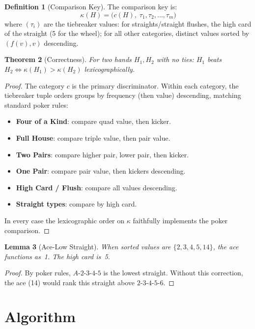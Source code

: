 \documentclass[12pt]{article}
\newtheorem{theorem}{Theorem}
\newtheorem{lemma}[theorem]{Lemma}
\theoremstyle{definition}
\newtheorem{definition}[theorem]{Definition}
\begin{document}
\begin{definition}[Comparison Key]
The comparison key is:
\[
\kappa(H) = \bigl(c(H),\; \tau_1, \tau_2, \ldots, \tau_m\bigr)
\]
where $(\tau_i)$ are the tiebreaker values: for straights/straight flushes, the high card of the straight (5 for the wheel); for all other categories, distinct values sorted by $(f(v), v)$ descending.
\end{definition}

\begin{theorem}[Correctness]
\label{thm:correct}
For two hands $H_1, H_2$ with no ties: $H_1$ beats $H_2 \iff \kappa(H_1) > \kappa(H_2)$ lexicographically.
\end{theorem}

\begin{proof}
The category $c$ is the primary discriminator. Within each category, the tiebreaker tuple orders groups by frequency (then value) descending, matching standard poker rules:
\begin{itemize}
    \item \textbf{Four of a Kind}: compare quad value, then kicker.
    \item \textbf{Full House}: compare triple value, then pair value.
    \item \textbf{Two Pairs}: compare higher pair, lower pair, then kicker.
    \item \textbf{One Pair}: compare pair value, then kickers descending.
    \item \textbf{High Card / Flush}: compare all values descending.
    \item \textbf{Straight types}: compare by high card.
\end{itemize}
In every case the lexicographic order on $\kappa$ faithfully implements the poker comparison.
\end{proof}

\begin{lemma}[Ace-Low Straight]
When sorted values are $\{2,3,4,5,14\}$, the ace functions as~1. The high card is~5.
\end{lemma}

\begin{proof}
By poker rules, $A$-$2$-$3$-$4$-$5$ is the lowest straight. Without this correction, the ace (14) would rank this straight above $2$-$3$-$4$-$5$-$6$.
\end{proof}

\section{Algorithm}
\end{document}
